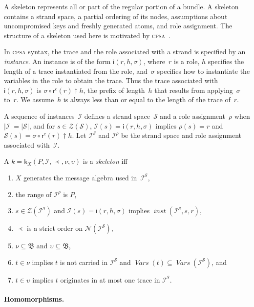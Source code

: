 \documentclass[12pt]{article}
\newcommand{\cpsa}{\textsc{cpsa}}
\newcommand{\fn}[1]{\ensuremath{\operatorname{\mathit{#1}}}}
\newcommand{\vars}{\fn{Vars}}
\newcommand{\prefix}[2]{#1\dagger#2}
\newcommand{\alg}[1]{\ensuremath{\mathfrak{#1}}}
\newcommand{\atm}{\alg{B}}
\newcommand{\ssp}{\ensuremath{\mathcal{S}}}
\newcommand{\strands}{\ensuremath{\mathcal{Z}}}
\newcommand{\nodes}{\ensuremath{\mathcal{N}}}
\newcommand{\rl}{\ensuremath{\rho}}
\newcommand{\skel}{\mathsf{k}}
\newcommand{\insta}{\mathsf{i}}
\newcommand{\insts}{\mathcal{I}}
\newcommand{\role}{\mathsf{r}}
\begin{document}
A skeleton represents all or part of the regular portion of a bundle.
A skeleton contains a strand space, a partial ordering of its nodes,
assumptions about uncompromised keys and freshly generated atoms, and
role assignment.  The structure of a skeleton used here is motivated
by {\cpsa}~\cite{cpsa09}.

In {\cpsa} syntax, the trace and the role associated with a strand is
specified by an \emph{instance}.  An instance is of
the form $\insta(r,h,\sigma)$, where~$r$ is a role, $h$ specifies the
length of a trace instantiated from the role, and~$\sigma$ specifies
how to instantiate the variables in the role to obtain the trace.
Thus the trace associated with $\insta(r,h,\sigma)$ is
$\sigma\circ\prefix{\role^c(r)}{h}$, the prefix of length~$h$ that
results from applying~$\sigma$ to~$r$.  We assume~$h$ is always less
than or equal to the length of the trace of~$r$.

A sequence of instances~$\insts$ defines a strand space~{\ssp} and a
role assignment~{\rl} when $|\insts|=|\ssp|$, and for
$s\in\strands(\ssp)$, $\insts(s)=\insta(r,h,\sigma)$ implies
$\rl(s)=r$ and $\ssp(s)=\sigma\circ\prefix{\role^c(r)}{h}$.  Let
$\insts^\ssp$ and $\insts^{\rl}$ be the strand space and role
assignment associated with~$\insts$.

A $k=\skel_X(P,\insts,\prec,\nu,\upsilon)$ is a \emph{skeleton} iff
\begin{enumerate}
\item $X$ generates the message algebra used in~$\insts^\ssp$,
\item the range of $\insts^{\rl}$ is $P$,
\item $s\in\strands(\insts^\ssp)$ and $\insts(s)=\insta(r,h,\sigma)$
  implies $\fn{inst}(\insts^\ssp, s, r)$,
\item $\prec$ is a strict order on $\nodes(\insts^\ssp)$,
\item $\nu\subseteq\atm$ and $\upsilon\subseteq\atm$,
\item $t\in\nu$ implies $t$ is not carried in $\insts^\ssp$ and
  $\vars(t)\subseteq\vars(\insts^\ssp)$, and
\item $t\in\upsilon$ implies $t$ originates in at most one trace in
  $\insts^\ssp$.
\end{enumerate}

\paragraph{Homomorphisms.}
\end{document}
